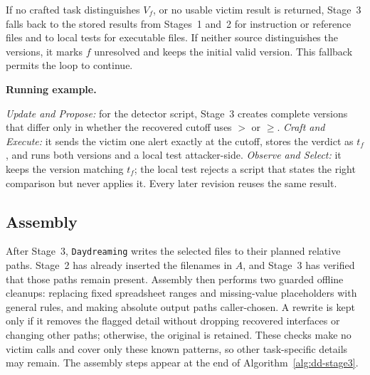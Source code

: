 \documentclass[letterpaper,twocolumn,10pt]{article}
\newcommand{\method}{\texttt{Daydreaming}\xspace}
\newcommand{\paragraphtitle}[1]{%
  \vspace{5pt}\noindent\textbf{#1.}%
}
\begin{document}
If no crafted task distinguishes $V_f$, or no usable victim result is returned,
Stage~3 falls back to the stored results from Stages~1 and~2 for instruction or
reference files and to local tests for executable files.  If neither source
distinguishes the versions, it marks $f$ unresolved and keeps the initial
valid version.  This fallback permits the loop to continue.

\paragraphtitle{Running example}
\emph{Update and Propose:} for the detector script, Stage~3 creates complete
versions that differ only in whether the recovered cutoff uses $>$ or $\geq$.
\emph{Craft and Execute:} it sends the victim one alert exactly at the cutoff,
stores the verdict as $t_f$, and runs both versions and a local test
attacker-side.  \emph{Observe and Select:} it keeps the version matching $t_f$;
the local test rejects a script that states the right comparison but never
applies it.  Every later revision reuses the same result.

\subsection{Assembly}
\label{sec:assembly}

After Stage~3, \method writes the selected files to their planned relative
paths.  Stage~2 has already inserted the filenames in $A$, and Stage~3 has
verified that those paths remain present.  Assembly then performs two guarded
offline cleanups: replacing fixed spreadsheet ranges
and missing-value placeholders with general rules, and making absolute output
paths caller-chosen.  A rewrite is kept only if it removes the flagged detail
without dropping recovered interfaces or changing other paths; otherwise, the
original is retained.  These checks make no victim calls and cover only these
known patterns, so other task-specific details may remain.  The assembly steps
appear at the end of Algorithm~\ref{alg:dd-stage3}.
\end{document}
